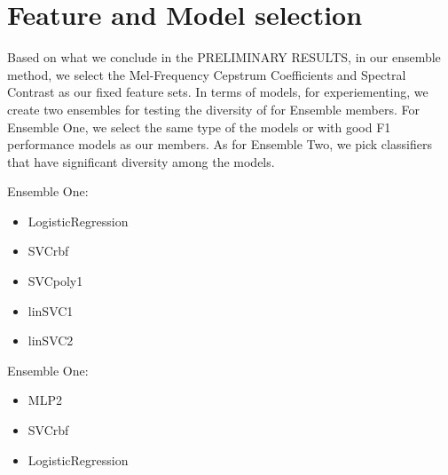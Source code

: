 \section{Feature and Model selection}




Based on what we conclude in the PRELIMINARY RESULTS, in our ensemble method, we select the Mel-Frequency Cepstrum Coefficients and Spectral Contrast as our fixed feature sets. In terms of models, for experiementing, we create two ensembles for testing the diversity of for Ensemble members. For Ensemble One, we select the same type of the models or with good F1 performance models as our members. As for Ensemble Two, we pick classifiers that have significant diversity among the models.

Ensemble One:
\begin{itemize}
    \item LogisticRegression
    \item SVCrbf
    \item SVCpoly1 
    \item linSVC1
    \item linSVC2
\end{itemize}

Ensemble One:
\begin{itemize}
    \item MLP2
    \item SVCrbf
    \item LogisticRegression
\end{itemize}
